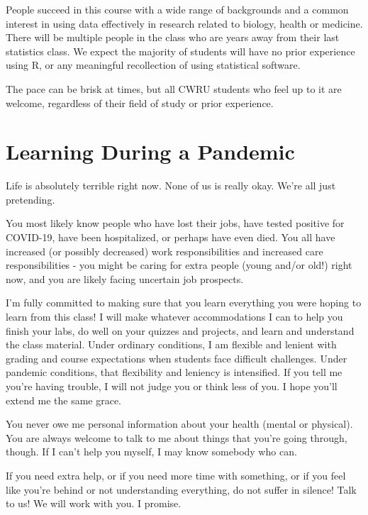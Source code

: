 \documentclass[
]{book}
\begin{document}
People succeed in this course with a wide range of backgrounds and a common interest in using data effectively in research related to biology, health or medicine. There will be multiple people in the class who are years away from their last statistics class. We expect the majority of students will have no prior experience using R, or any meaningful recollection of using statistical software.

The pace can be brisk at times, but all CWRU students who feel up to it are welcome, regardless of their field of study or prior experience.

\hypertarget{learning-during-a-pandemic}{%
\section{Learning During a Pandemic}\label{learning-during-a-pandemic}}

Life is absolutely terrible right now. None of us is really okay. We're all just pretending.

You most likely know people who have lost their jobs, have tested positive for COVID-19, have been hospitalized, or perhaps have even died. You all have increased (or possibly decreased) work responsibilities and increased care responsibilities - you might be caring for extra people (young and/or old!) right now, and you are likely facing uncertain job prospects.

I'm fully committed to making sure that you learn everything you were hoping to learn from this class! I will make whatever accommodations I can to help you finish your labs, do well on your quizzes and projects, and learn and understand the class material. Under ordinary conditions, I am flexible and lenient with grading and course expectations when students face difficult challenges. Under pandemic conditions, that flexibility and leniency is intensified. If you tell me you're having trouble, I will not judge you or think less of you. I hope you'll extend me the same grace.

You never owe me personal information about your health (mental or physical). You are always welcome to talk to me about things that you're going through, though. If I can't help you myself, I may know somebody who can.

If you need extra help, or if you need more time with something, or if you feel like you're behind or not understanding everything, do not suffer in silence! Talk to us! We will work with you. I promise.
\end{document}
